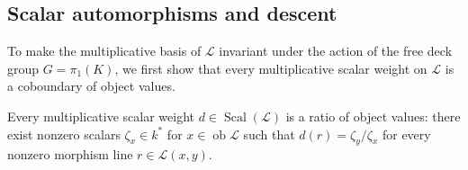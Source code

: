 \subsection{Scalar automorphisms and descent}
\label{subsec:scalar-descent}

To make the multiplicative basis of $\mathcal L$ invariant under the action
of the free deck group $G=\pi_1(K)$, we first show that every multiplicative
scalar weight on $\mathcal L$ is a coboundary of object values.

\begin{lemma}
\label{lem:scalar-object-values}
Every multiplicative scalar weight $d\in\operatorname{Scal}(\mathcal L)$ is a
ratio of object values: there exist nonzero scalars $\zeta_x\in k^*$ for
$x\in\operatorname{ob}\mathcal L$ such that $d(r)=\zeta_y/\zeta_x$ for every
nonzero morphism line $r\in\mathcal L(x,y)$.
\end{lemma}
